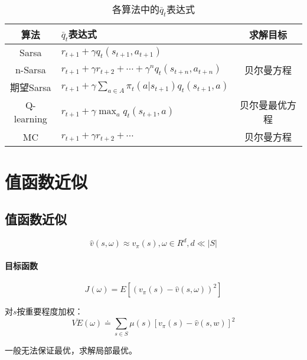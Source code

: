\documentclass[
12pt, %
a4paper, 
oneside, %
headinclude,footinclude, %
]{scrartcl}
\begin{document}
\begin{table}[H]
\centering
\begin{tabular}{|c|l|c|}
\hline
算法 & $ \bar{q}_t $表达式 & 求解目标 \\
\hline
Sarsa & $ r_{t + 1} + \gamma q_t(s_{t + 1}, a_{t + 1}) $ & \multirow{3}{*}{贝尔曼方程} \\
\cline{1-2}
n-Sarsa & $ r_{t + 1} + \gamma r_{t + 2} + \cdots + \gamma^n q_t(s_{t + n}, a_{t + n}) $ &  \\
\cline{1-2}
期望Sarsa & $ r_{t + 1} + \gamma \sum_{a \in A} \pi_t(a|s_{t + 1}) q_t(s_{t + 1}, a) $ &  \\
\hline
Q-learning & $ r_{t + 1} + \gamma \max_a q_t(s_{t + 1}, a) $ & 贝尔曼最优方程 \\
\hline
MC & $ r_{t + 1} + \gamma r_{t + 2} + \cdots $ & 贝尔曼方程 \\
\hline
\end{tabular}
\caption{各算法中的$ \bar{q}_t $表达式}
\end{table}
\section{值函数近似}
\subsection[值函数近似]{值函数近似}
$$ \hat{v}(s, \omega) \approx v_{\pi}(s), \omega \in R^d, d \ll |S| $$
\paragraph{目标函数}
$$ J(\omega) = E[(v_{\pi}(s) - \hat{v}(s, \omega))^2] $$

对$ s $按重要程度加权：
$$ \overline{VE}(\omega) \doteq \sum_{s \in S} \mu(s) [v_\pi(s) - \hat{v}(s, w)]^2 $$

一般无法保证最优，求解局部最优。
\end{document}
